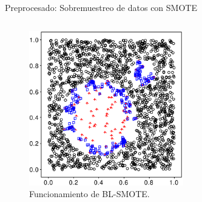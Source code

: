 \documentclass{beamer}
\begin{document}
\begin{frame}{Preprocesado: Sobremuestreo de datos con SMOTE}
\begin{columns}[T]
\begin{column}{.5\textwidth}
			\vspace*{-0.75cm}
			\begin{figure}[H]
				 \centering
				 \includegraphics[width=0.6\textwidth]{bl-smote-datos-sinteticos.png}
				 \caption{Funcionamiento de BL-SMOTE.}
				 \label{fig:bl-smote-datos-sinteticos}
			\end{figure}
		\end{column}

	\end{columns}

\end{frame}
\end{document}
